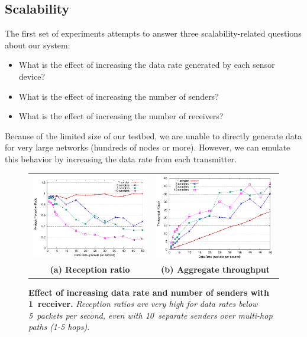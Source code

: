 \subsection{Scalability}


The first set of experiments attempts to answer three 
scalability-related questions about our system:
\begin{itemize}
\item What is the effect of increasing the data rate generated
by each sensor device?
\item What is the effect of increasing the number of senders?
\item What is the effect of increasing the number of receivers?
\end{itemize}
Because of the limited size of our testbed, we are unable to directly 
generate data for very large networks (hundreds of nodes or more).
However, we can emulate this behavior by increasing the
data rate from each transmitter.

\begin{figure}[t]
\begin{center}
\begin{tabular}{cc}
\includegraphics[width=0.45\hsize]{./resources/codeblue-nsdi06/figures/eval/warmup/varyNumSenders.pdf}
& 
\includegraphics[width=0.45\hsize]{./resources/codeblue-nsdi06/figures/eval/warmup/throughput1recv.pdf}
\\
{\small\bf (a) Reception ratio} & {\small\bf (b) Aggregate throughput} \\
\end{tabular}
\end{center}
\caption{\small {\bf Effect of increasing data rate and number of
senders with 1~receiver.} 
{\em Reception ratios are very high for data rates below 5~packets per second, 
even with 10~separate senders over multi-hop paths (1-5 hops).}}
\label{fig-eval-varyNumSenders}
\end{figure}

